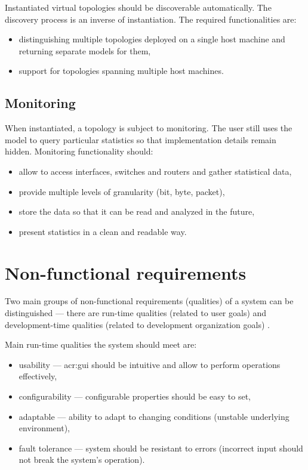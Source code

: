 \documentclass[11pt,openany]{book}
\begin{document}
        Instantiated virtual topologies should be discoverable automatically. The discovery process is an inverse of
        instantiation. The required functionalities are:

        \begin{itemize}
          \item distinguishing multiple topologies deployed on a single host machine and returning separate models for
                them,
          \item support for topologies spanning multiple host machines.
        \end{itemize}


      \subsection{Monitoring}
      \label{sec:req:func:acc}

        When instantiated, a topology is subject to monitoring. The user still uses the model to query particular
        statistics so that implementation details remain hidden. Monitoring functionality should:

        \begin{itemize}
          \item allow to access interfaces, switches and routers and gather statistical data,
          \item provide multiple levels of granularity (bit, byte, packet),
          \item store the data so that it can be read and analyzed in the future,
          \item present statistics in a clean and readable way.
        \end{itemize}


    \section{Non-functional requirements}
    \label{sec:req:nonfunc}

      Two main groups of non-functional requirements (qualities) of a system can be distinguished --- there are run-time
      qualities (related to user goals) and development-time qualities (related to development organization goals)
      \cite{nonfunctional}.

      Main run-time qualities the system should meet are:

      \begin{itemize}
        \item usability --- \gls{acr:gui} should be intuitive and allow to perform operations effectively,
        \item configurability --- configurable properties should be easy to set,
        \item adaptable --- ability to adapt to changing conditions (unstable underlying environment),
        \item fault tolerance --- system should be resistant to errors (incorrect input should not break the system's
                                  operation).
      \end{itemize}
\end{document}

